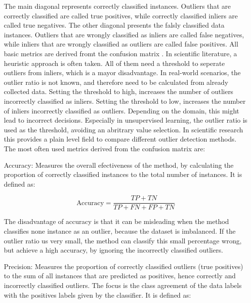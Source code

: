 

The main diagonal represents correctly classified instances.
Outliers that are correctly classified are called true positives, while correctly classified inliers are called true negatives.
The other diagonal presents the falsly classified data instances.
Outliers that are wrongly classified as inliers are called false negatives, while inliers that are wrongly classified as outliers are called false positives.
All basic metrics are derived fromt the confusion matrix \citep[p.4]{saito2015precision}. 
In scientific literature, a heuristic approach is often taken.
All of them need a threshold to seperate outliers from inliers, which is a mayor disadvantage.
In real-world scenarios, the outlier ratio is not known, and therefore need to be calculated from already collected data.
Setting the threshold to high, increases the number of outliers incorrectly classified as inliers.
Setting the threshold to low, increases the number of inliers incorrectly classified as outliers.
Depending on the domain, this might lead to incorrect decisions.  
Especially in unsupervised learning, the outlier ratio is used as the threshold, avoiding an abritrary value selection.
In scientific research this provides a plain level field to compare different outlier detection methods.
The most often used metrics derived from the confusion matrix are:


\enumerate

    \item Accuracy: Measures the overall efectiveness of the method, by calculating the proportion of correctly classified instances to the total number of instances.
    It is defined as:
    
    \begin{equation}
        \text{Accuracy} = \frac{TP + TN}{TP + FN + FP + TN}
    \end{equation}

    The disadvantage of accuracy is that it can be misleading when the method classifies none instance as an outlier, because the dataset is imbalanced.
    If the outlier ratio us very small, the method can classify this small percentage wrong, but achieve a high accuracy, by ignoring the incorrectly classified outliers.

    \item Precision: Measures the proportion of correctly classified outliers (true positives) to the sum of all instances that are predicted as positives, hence correctly and incorrectly classified outliers.
    The focus is the class agreement of the data labels with the positives labels given by the classifier.
    It is defined as: 


